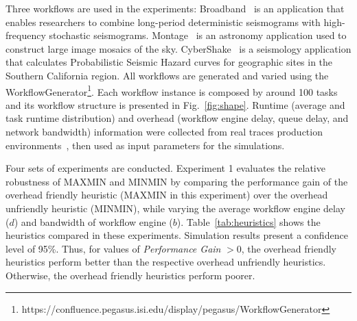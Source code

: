 \documentclass[final]{IEEEtran}
\begin{document}
Three workflows are used in the experiments: 
Broadband~\cite{Broadband} is an application that enables researchers to combine long-period deterministic seismograms with high-frequency stochastic seismograms. 
Montage~\cite{Sakellariou2010} is an astronomy application used to construct large image mosaics of the sky. CyberShake~\cite{Callaghan2008} is a seismology application that calculates Probabilistic Seismic Hazard curves for geographic sites in the Southern California region. All workflows are generated and varied using the WorkflowGenerator\footnote[1]{https://confluence.pegasus.isi.edu/display/pegasus/WorkflowGenerator}. Each workflow instance is composed by around 100 tasks and its workflow structure is presented in Fig.~\ref{fig:shape}. Runtime (average and task runtime distribution) and overhead (workflow engine delay, queue delay, and network bandwidth) information were collected from real traces production environments~\cite{Chen, Juve2013}, then used as input parameters for the simulations.




Four sets of experiments are conducted. Experiment 1 evaluates the relative robustness of MAXMIN and MINMIN by comparing the performance gain of the overhead friendly heuristic (MAXMIN in this experiment) over the overhead unfriendly heuristic (MINMIN), while varying the average workflow engine delay ($d$) and bandwidth of workflow engine ($b$). Table~\ref{tab:heuristics} shows the heuristics compared in these experiments. Simulation results present a confidence level of 95\%. Thus, for values of \emph{Performance Gain} $> 0$, the overhead friendly heuristics perform better than the respective overhead unfriendly heuristics. Otherwise, the overhead friendly heuristics perform poorer.
\end{document}
